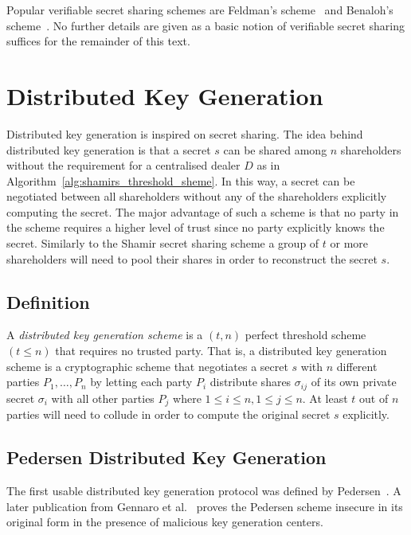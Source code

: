Popular verifiable secret sharing schemes are Feldman's scheme~\cite{art:Feldman87} and Benaloh's scheme~\cite{art:Benaloh86a}. No further details are given as a basic notion of verifiable secret sharing suffices for the remainder of this text.

\section{Distributed Key Generation}
\label{sec:distributed_key_generation}
Distributed key generation is inspired on secret sharing. The idea behind distributed key generation is that a secret $s$ can be shared among $n$ shareholders without the requirement for a centralised dealer $D$ as in Algorithm~\ref{alg:shamirs_threshold_sheme}. In this way, a secret can be negotiated between all shareholders without any of the shareholders explicitly computing the secret. The major advantage of such a scheme is that no party in the scheme requires a higher level of trust since no party explicitly knows the secret. Similarly to the Shamir secret sharing scheme a group of $t$ or more shareholders will need to pool their shares in order to reconstruct the secret $s$.

\subsection{Definition}
\begin{defn}
\label{def:dkg_scheme}
 A \textit{distributed key generation scheme} is a $\left( t,n \right)$ perfect threshold scheme $\left( t \leq n \right)$ that requires no trusted party. That is, a distributed key generation scheme is a cryptographic scheme that negotiates a secret $s$ with $n$ different parties $P_1, \ldots, P_n$ by letting each party $P_i$ distribute shares $\sigma_{ij}$ of its own private secret $\sigma_i$ with all other parties $P_j$ where $1 \leq i \leq n, 1 \leq j \leq n$. At least $t$ out of $n$ parties will need to collude in order to compute the original secret $s$ explicitly.
\end{defn}

\subsection{Pedersen Distributed Key Generation}
The first usable distributed key generation protocol was defined by Pedersen~\cite{art:Pedersen91a}. A later publication from Gennaro et al.~\cite{art:GennaroJKR07} proves the Pedersen scheme insecure in its original form in the presence of malicious key generation centers.

